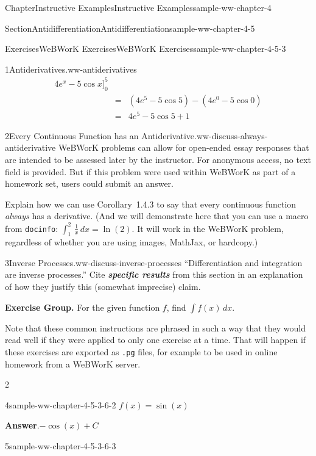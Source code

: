 \documentclass[oneside,10pt,]{book}
\newcommand{\blocktitlefont}{\relax}
\newcommand{\mono}[1]{\texttt{#1}}
\newcommand{\alert}[1]{\textbf{\textit{#1}}}
\numberwithin{equation}{section}
\newcommand{\definiteintegral}[4]{\int_{#1}^{#2}\,#3\,d#4}
\newcommand{\indefiniteintegral}[2]{\int#1\,d#2}
\newcommand{\amp}{&}
\begin{document}
\begin{chapterptx}{Chapter}{Instructive Examples}{}{Instructive Examples}{}{}{sample-ww-chapter-4}
\begin{sectionptx}{Section}{Antidifferentiation}{}{Antidifferentiation}{}{}{sample-ww-chapter-4-5}
\begin{exercises-subsection}{Exercises}{WeBWorK Exercises}{}{WeBWorK Exercises}{}{}{sample-ww-chapter-4-5-3}
\begin{divisionexercise}{1}{Antiderivatives.}{}{ww-antiderivatives}
\begin{equation*}
\begin{array}{rcl}
\displaystyle  4 e^x-5 \cos x  \Big]_0^{5}
\\ \amp =\amp  (4 e^{5} - 5 \cos 5) - (4 e^0 - 5 \cos0 ) 
\\ \amp =\amp  4 e^{5} - 5 \cos 5  + 1 
\end{array}
\end{equation*}
%
\end{divisionexercise}%
\begin{divisionexercise}{2}{Every Continuous Function has an Antiderivative.}{}{ww-discuss-always-antiderivative}%
WeBWorK problems can allow for open-ended essay responses that are intended to be assessed later by the instructor. For anonymous access, no text field is provided. But if this problem were used within WeBWorK as part of a homework set, users could submit an answer.%
\par
Explain how we can use Corollary~1.4.3 to say that every continuous function \emph{always} has a derivative. (And we will demonstrate here that you can use a  macro from \mono{docinfo}: \(\definiteintegral{1}{2}{\frac{1}{x}}{x}=\ln(2)\text{.}\) It will work in the WeBWorK problem, regardless of whether you are using images, MathJax, or hardcopy.)%
\end{divisionexercise}%
\begin{divisionexercise}{3}{Inverse Processes.}{}{ww-discuss-inverse-processes}%
``Differentiation and integration are inverse processes.''  Cite \alert{specific results} from this section in an explanation of how they justify this (somewhat imprecise) claim.%
\end{divisionexercise}%
\par\medskip\noindent%
\textbf{Exercise Group.}\space\space%
For the given function \(f\), find \(\indefiniteintegral{f(x)}{x}\).%
\par
Note that these common instructions are phrased in such a way that they would read well if they were applied to only one exercise at a time. That will happen if these exercises are exported as \mono{.pg} files, for example to be used in online homework from a WeBWorK server.%
\begin{exercisegroupcol}{2}
\begin{divisionexerciseegcol}{4}{}{}{sample-ww-chapter-4-5-3-6-2}%
\(f(x)=\sin(x)\)%
\par\smallskip%
\noindent\textbf{\blocktitlefont Answer}.\hypertarget{sample-ww-chapter-4-5-3-6-2-2}{}\quad{}\(-\cos\!\left(x\right)+C\)%
\end{divisionexerciseegcol}%
\begin{divisionexerciseegcol}{5}{}{}{sample-ww-chapter-4-5-3-6-3}%

\end{divisionexerciseegcol}
\end{exercisegroupcol}
\end{exercises-subsection}
\end{sectionptx}
\end{chapterptx}
\end{document}
